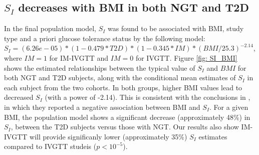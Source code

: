 \documentclass[utf8]{frontiersSCNS} %
\begin{document}
\subsection{$S_I$ decreases with BMI in both NGT and T2D}
In the final population model, $S_I$ was found to be associated with BMI, study type and a priori glucose tolerance status by the following model: $S_I=(6.26e-05)*(1-0.479*T2D)*(1-0.345*IM)*(BMI/25.3)^{-2.14}$, where $IM=1$ for IM-IVGTT and $IM=0$ for IVGTT. Figure \ref{fig: SI_BMI} shows the estimated relationships between the typical value of $S_I$ and $BMI$ for both NGT and T2D subjects, along with the conditional mean estimates of $S_I$ in each subject from the two cohorts. In both groups, higher BMI values lead to decreased $S_I$ (with a power of -2.14). This is consistent with the conclusions in \citet{Bergman1997TheTolerance}, in which they reported a negative association between BMI and $S_I$. For a given BMI, the population model shows a significant decrease (approximately 48\%) in $S_I$, between the T2D subjects versus those with NGT. Our results also show IM-IVGTT will provide significanly lower (approximately 35\%) $S_I$ estimates compared to IVGTT studeis ($p<10^{-5}$). \\
\vskip 0.5cm
\end{document}

